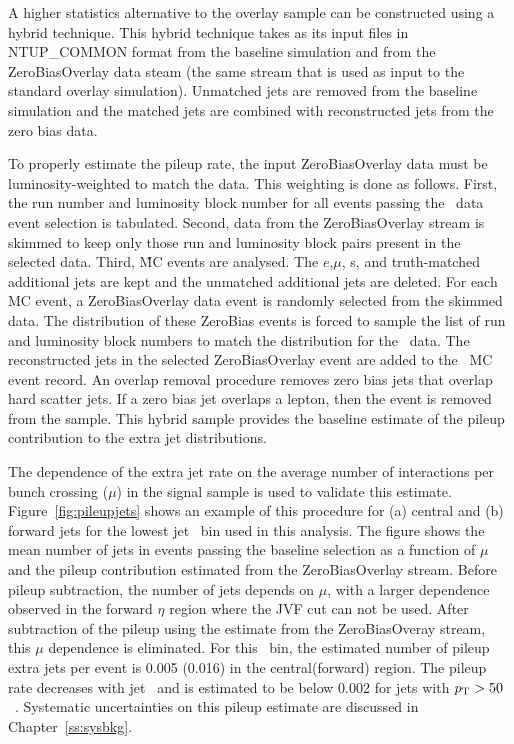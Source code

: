 A higher statistics alternative to the overlay sample can be constructed using a hybrid technique.
This hybrid technique takes as its input files in NTUP\_COMMON format
from the baseline simulation and from the ZeroBiasOverlay data steam (the same stream that is 
used as input to the standard overlay simulation).  
Unmatched jets are removed from the baseline simulation
and the matched jets are combined with reconstructed jets from the zero bias data.  

To properly estimate the pileup rate, the input ZeroBiasOverlay data must be luminosity-weighted
to match the data.  This weighting is done as follows.  First, the run number and luminosity block number 
for all events passing the \emubb\ data event selection is tabulated.  Second, data from the ZeroBiasOverlay
stream is skimmed to keep only those run and luminosity block pairs present in the selected data.
Third, \ttbar\~MC events are analysed.
The $e$,$\mu$, \bjet s, and truth-matched additional jets are kept and the unmatched
additional jets are deleted.  For each MC event, a ZeroBiasOverlay data event is 
randomly selected from the skimmed data.
The distribution of these ZeroBias events is forced to sample the list of run and luminosity block numbers
to match the distribution for the \emubb\ data.  The reconstructed jets in the selected ZeroBiasOverlay
event are added to the \ttbar\ MC event record.  An overlap 
removal procedure removes zero bias jets that overlap hard scatter jets.
If a zero bias jet overlaps a lepton, then the event is removed from the sample. 
This hybrid sample provides the baseline estimate of the pileup contribution to the 
extra jet distributions. 

The dependence of the extra jet rate on the average number of interactions per bunch crossing ($\mu$) in the signal sample is used to validate this estimate. %
 Figure~\ref{fig:pileupjets} shows an example of this procedure for (a) central and (b) forward jets for the lowest jet \pt\ bin used in this analysis. The figure shows the mean number of jets in events passing the baseline selection as a function of $\mu$ and the pileup contribution estimated from the ZeroBiasOverlay stream. Before pileup subtraction, the number of jets depends on $\mu$, with a larger dependence observed in the forward $\eta$ region where the JVF cut can not be used. After subtraction of the pileup using the estimate from the ZeroBiasOveray stream, this $\mu$ dependence is eliminated. For this \pt\ bin, the estimated number of pileup extra jets per
event is 0.005 (0.016) in the central(forward) region. 
The pileup rate decreases with jet \pT\ and is estimated to be below 0.002 for jets with $p_{\text{T}}>50$~\GeV.
Systematic uncertainties on this pileup estimate are discussed in Chapter~\ref{ss:sysbkg}.
 
